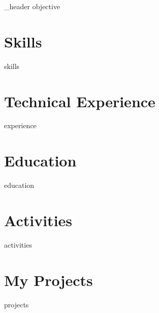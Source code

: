 \documentclass[letter,10pt]{article}
\author{Andrei Petrov}
\begin{document}
{_header}
{objective}

\section{Skills}
{skills}

\section{Technical Experience}
{experience}

\section{Education}
{education}


\section{Activities}
{activities}

\newpage
\section{My Projects}
{projects}




\end{document}
